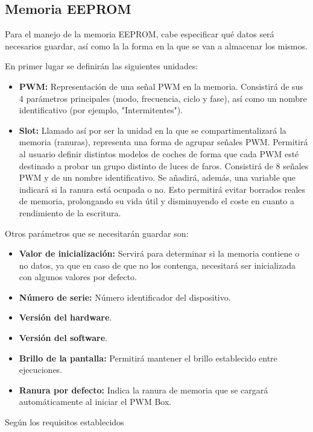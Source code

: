 \subsection{Memoria EEPROM}

Para el manejo de la memoria EEPROM, cabe especificar qué datos será necesarios guardar, así como la la forma en la que se van a almacenar los mismos.

En primer lugar se definirán las siguientes unidades:

\begin{itemize}
    \item\textbf{PWM:} Representación de una señal PWM en la memoria. Consistirá de sus 4 parámetros principales (modo, frecuencia, ciclo y fase), así como un nombre identificativo (por ejemplo, "Intermitentes").
    \item\textbf{Slot:} Llamado así por ser la unidad en la que se compartimentalizará la memoria (ranuras), representa una forma de agrupar señales PWM. Permitirá al usuario definir distintos modelos de coches de forma que cada PWM esté destinado a probar un grupo distinto de luces de faros. Consistirá de 8 señales PWM y de un nombre identificativo. Se añadirá, además, una variable que indicará si la ranura está ocupada o no. Esto permitirá evitar borrados reales de memoria, prolongando su vida útil y disminuyendo el coste en cuanto a rendimiento de la escritura.
\end{itemize}

Otros parámetros que se necesitarán guardar son:

\begin{itemize}
    \item\textbf{Valor de inicialización:} Servirá para determinar si la memoria contiene o no datos, ya que en caso de que no los contenga, necesitará ser inicializada con algunos valores por defecto.
    \item\textbf{Número de serie:} Número identificador del dispositivo.
    \item\textbf{Versión del hardware}.
    \item\textbf{Versión del software}.
    \item\textbf{Brillo de la pantalla:} Permitirá mantener el brillo establecido entre ejecuciones.
    \item\textbf{Ranura por defecto:} Indica la ranura de memoria que se cargará automáticamente al iniciar el PWM Box.
\end{itemize}

Según los requisitos establecidos 

